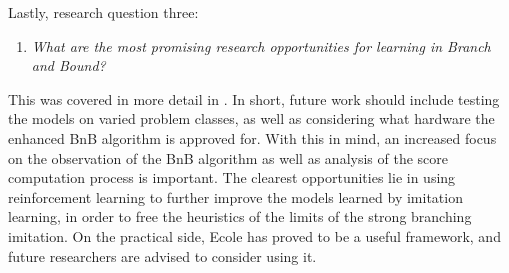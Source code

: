 Lastly, research question three:
%
\begin{enumerate}[resume*]
    \item \textit{What are the most promising research opportunities for learning in Branch and Bound?}
\end{enumerate}
%
This was covered in more detail in . In short, future work should include testing the models on varied problem classes, as well as considering what hardware the enhanced \gls{BnB} algorithm is approved for. With this in mind, an increased focus on the observation of the \gls{BnB} algorithm as well as analysis of the score computation process is important. The clearest opportunities lie in using reinforcement learning to further improve the models learned by imitation learning, in order to free the heuristics of the limits of the strong branching imitation. On the practical side, \gls{Ecole} has proved to be a useful framework, and future researchers are advised to consider using it.  
